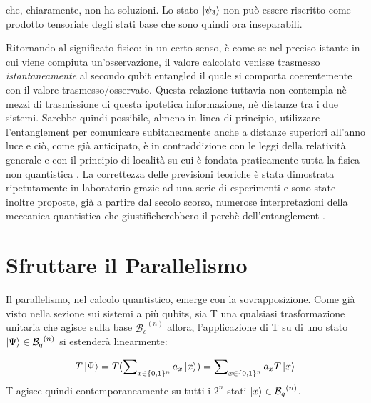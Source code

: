 \documentclass[12pt,a4paper,openright]{report}
\begin{document}
che, chiaramente, non ha soluzioni. Lo stato $\ket{\psi_3}$ non può essere riscritto come prodotto tensoriale degli stati base che sono quindi ora inseparabili.\par
Ritornando al significato fisico: in un certo senso, è come se nel preciso istante in cui viene compiuta un'osservazione, il valore calcolato venisse trasmesso \emph{istantaneamente} al secondo qubit entangled il quale si comporta coerentemente
con il valore trasmesso/osservato. Questa relazione tuttavia non contempla nè mezzi di trasmissione di questa ipotetica informazione, nè distanze tra i due sistemi. Sarebbe quindi possibile, almeno in linea di
principio, utilizzare l'entanglement per comunicare subitaneamente anche a distanze superiori all'anno luce e ciò, come già anticipato, è in contraddizione con le leggi della relatività generale e con il 
principio di località su cui è fondata praticamente tutta la fisica non quantistica \cite{ref9}. La correttezza delle previsioni teoriche è stata dimostrata ripetutamente in laboratorio grazie ad una serie
di esperimenti \cite{ref10} e sono state inoltre proposte, già a partire dal secolo scorso, numerose interpretazioni della meccanica quantistica che giustificherebbero il perchè dell'entanglement \cite{ref11}.

\section{Sfruttare il Parallelismo}

Il parallelismo, nel calcolo quantistico, emerge con la sovrapposizione. Come già visto nella sezione sui sistemi a più qubits, sia T una qualsiasi trasformazione unitaria che agisce sulla base ${\mathcal{B}_c}^{(n)}$
allora, l'applicazione di T su di uno stato $\ket{\Psi}\in{{\mathcal{B}_q}^{(n)}}$ si estenderà linearmente:

\[
    T\ket{\Psi} = T(\sum\nolimits_{x \in\{0,1\}^{n}} a_x \ket{x}) = \sum\nolimits_{x \in\{0,1\}^{n}} a_x T\ket{x}
\]
T agisce quindi contemporaneamente su tutti i $2^n$ stati $\ket{x}\in{{\mathcal{B}_q}^{(n)}}$.

\par
\end{document}
